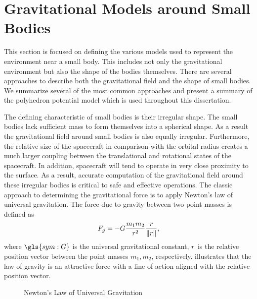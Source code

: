 \section{Gravitational Models around Small Bodies}\label{sec:gravitational_models}
This section is focused on defining the various models used to represent the environment near a small body.
This includes not only the gravitational environment but also the shape of the bodies themselves.
There are several approaches to describe both the gravitational field and the shape of small bodies.
We summarize several of the most common approaches and present a summary of the polyhedron potential model which is used throughout this dissertation.

The defining characteristic of small bodies is their irregular shape.
The small bodies lack sufficient mass to form themselves into a spherical shape.
As a result the gravitational field around small bodies is also equally irregular.
Furthermore, the relative size of the spacecraft in comparison with the orbital radius creates a much larger coupling between the translational and rotational states of the spacecraft.
In addition, spacecraft will tend to operate in very close proximity to the surface.
As a result, accurate computation of the gravitational field around these irregular bodies is critical to safe and effective operations.
The classic approach to determining the gravitational force is to apply Newton's law of universal gravitation.
The force due to gravity between two point masses is defined as
\begin{align}\label{eq:newton_universal_gravitation}
    F_g =  - G \frac{m_1 m_2}{r^2} \frac{r}{\left\| r \right\|},
\end{align}
where \( \gls{sym:G} \) is the universal gravitational constant, \( r \) is the relative position vector between the point masses \( m_1, m_2\), respectively.
 illustrates that the law of gravity is an attractive force with a line of action aligned with the relative position vector.
\begin{figure}
    \centering
    
    \caption{Newton's Law of Universal Gravitation~\label{fig:universal_gravity}}
\end{figure}

